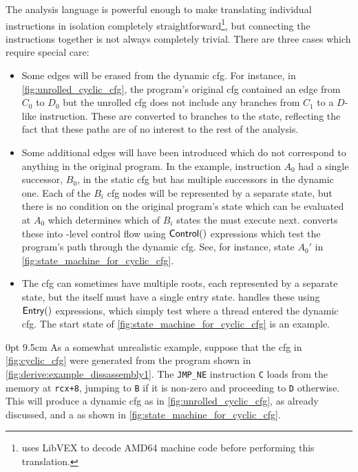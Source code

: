 The {\StateMachine} analysis language is powerful enough to make
translating individual instructions in isolation completely
straightforward\footnote{{\Implementation} uses LibVEX\cite[Chapter
    2]{Seward2012} to decode AMD64 machine code before performing this
  translation.}, but connecting the instructions together is not
always completely trivial.  There are three cases which require
special care:
\begin{itemize}
\item
  Some edges will be erased from the dynamic \gls{cfg}.  For instance,
  in \autoref{fig:unrolled_cyclic_cfg}, the program's original
  \gls{cfg} contained an edge from $C_0$ to $D_0$ but the unrolled
  \gls{cfg} does not include any branches from $C_1$ to a $D$-like
  instruction.  These are converted to branches to the {\stUnreached}
  state, reflecting the fact that these paths are of no interest to
  the rest of the analysis.
\item
  Some additional edges will have been introduced which do not
  correspond to anything in the original program.  In the example,
  instruction $A_0$ had a single successor, $B_0$, in the static
  \gls{cfg} but has multiple successors in the dynamic one.  Each of
  the $B_i$ \gls{cfg} nodes will be represented by a separate
  {\StateMachine} state, but there is no condition on the original
  program's state which can be evaluated at $A_0$ which determines
  which of $B_i$ states the {\StateMachine} must execute next.
  {\Technique} converts these into {\StateMachine}-level control flow
  using ${\mathsf{Control}}()$ expressions which test the program's
  path through the dynamic \gls{cfg}.  See, for instance, state $A_0'$
  in \autoref{fig:state_machine_for_cyclic_cfg}.
\item
  The \gls{cfg} can sometimes have multiple roots, each represented by
  a separate {\StateMachine} state, but the {\StateMachine} itself
  must have a single entry state.  {\Technique} handles these using
  $\mathsf{Entry}()$ expressions, which simply test where a thread entered
  the dynamic \gls{cfg}.  The start state of
  \autoref{fig:state_machine_for_cyclic_cfg} is an example.
\end{itemize}

  0pt 9.5cm
\noindent As a somewhat unrealistic example, suppose that the
\gls{cfg} in \autoref{fig:cyclic_cfg} were generated from the program
shown in \autoref{fig:derive:example_dissassembly1}.  The
\texttt{JMP\_NE} instruction \texttt{C} loads from the memory at
\texttt{rcx+8}, jumping to \texttt{B} if it is non-zero and proceeding
to \texttt{D} otherwise.  This will produce a dynamic \gls{cfg} as in
\autoref{fig:unrolled_cyclic_cfg}, as already discussed, and a
\StateMachine{} as shown in
\autoref{fig:state_machine_for_cyclic_cfg}.

